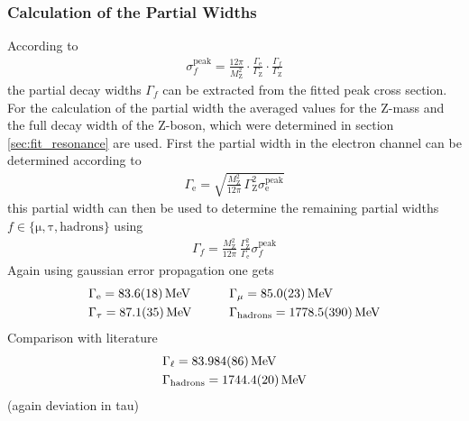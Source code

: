 \documentclass[11pt, a4paper]{article}
\numberwithin{equation}{section}
\newcommand{\korr}[1]{{\color{red}(#1)}}
\begin{document}
\subsubsection{Calculation of the Partial Widths}
According to
\begin{align*}
	\sigma_f^\mathrm{peak} = \frac{12 \pi}{M_\mathrm{Z}^2} \cdot \frac{\Gamma_\mathrm{e}}{\Gamma_\mathrm{Z}} \cdot \frac{\Gamma_f}{\Gamma_\mathrm{Z}} 
\end{align*}
the partial decay widths $\Gamma_f$ can be extracted from the fitted peak cross section.
For the calculation of the partial width the averaged values for the Z-mass and the full decay width of the Z-boson, which were determined in section \ref{sec:fit_resonance} are used.
First the partial width in the electron channel can be determined according to
\begin{align*}
	\Gamma_\mathrm{e} = \sqrt{\frac{M_\mathrm{Z}^2}{12 \pi} \, \Gamma_\mathrm{Z}^2 \sigma_\mathrm{e}^\mathrm{peak}}
\end{align*}
this partial width can then be used to determine the remaining partial widths $f \in \{ \mathrm{\mu}, \mathrm{\tau}, \mathrm{hadrons} \}$ using
\begin{align*}
	\Gamma_f = \frac{M_\mathrm{Z}^2}{12 \pi } \, \frac{\Gamma_\mathrm{Z}^2 }{\Gamma_\mathrm{e}} \sigma_f^\mathrm{peak}
\end{align*}
Again using gaussian error propagation one gets
\begin{alignat*}{2}
	&\Gamma_\mathrm{e} = \SI{83.6 +- 1.8}{MeV} \qquad
	&&\Gamma_\mathrm{\mu} = \SI{85.0 +- 2.3}{MeV}\\
	&\Gamma_\mathrm{\tau} = \SI{87.1 +- 3.5}{MeV}\qquad
	&&\Gamma_\mathrm{hadrons} = \SI{1778.5 +- 39}{MeV}
\end{alignat*}
Comparison with literature \cite{pdg}
\begin{align*}
	&\Gamma_\ell = \SI{83.984 +- 0.086}{MeV} \\
	&\Gamma_\mathrm{hadrons} = \SI{1744.4 +- 2.0}{MeV}
\end{align*}
\korr{again deviation in tau}
\end{document}
